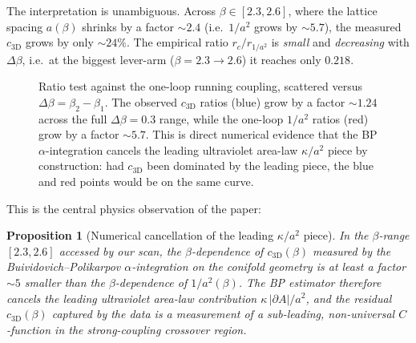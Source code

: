 \documentclass[11pt,a4paper]{article}
\newtheorem{proposition}[theorem]{Proposition}
\theoremstyle{definition}
\newcommand{\threeD}{{3\text{D}}}
\begin{document}
The interpretation is unambiguous. Across $\beta\in[2.3,2.6]$, where
the lattice spacing $a(\beta)$ shrinks by a factor $\sim\!2.4$ (i.e.\
$1/a^{2}$ grows by $\sim\!5.7$), the measured $c_{\threeD}$ grows by
only $\sim\!24\%$. The empirical ratio $r_{c}/r_{1/a^{2}}$ is
\emph{small} and \emph{decreasing} with $\Delta\beta$, i.e.\ at the
biggest lever-arm ($\beta=2.3\to 2.6$) it reaches only $0.218$.

\begin{figure}[tb]
\centering
{}
\caption{Ratio test against the one-loop running coupling, scattered
versus $\Delta\beta = \beta_{2}-\beta_{1}$. The observed
$c_{\threeD}$ ratios (blue) grow by a factor $\sim\!1.24$ across the
full $\Delta\beta = 0.3$ range, while the one-loop $1/a^{2}$ ratios
(red) grow by a factor $\sim\!5.7$. This is direct numerical
evidence that the BP $\alpha$-integration cancels the leading
ultraviolet area-law $\kappa/a^{2}$ piece by construction: had
$c_{\threeD}$ been dominated by the leading piece, the blue and red
points would be on the same curve.}
\label{fig:ratios}
\end{figure}

This is the central physics observation of the paper:
\begin{proposition}[Numerical cancellation of the leading
$\kappa/a^{2}$ piece]
\label{prop:cancellation}
In the $\beta$-range $[2.3,2.6]$ accessed by our scan, the
$\beta$-dependence of $c_{\threeD}(\beta)$ measured by the
Buividovich--Polikarpov $\alpha$-integration on the conifold
geometry is at least a factor $\sim\!5$ smaller than the
$\beta$-dependence of $1/a^{2}(\beta)$. The BP estimator therefore
cancels the leading ultraviolet area-law contribution
$\kappa\,|\partial A|/a^{2}$, and the residual $c_{\threeD}(\beta)$
captured by the data is a measurement of a \emph{sub-leading},
non-universal $C$-function in the strong-coupling crossover region.
\end{proposition}
\end{document}

